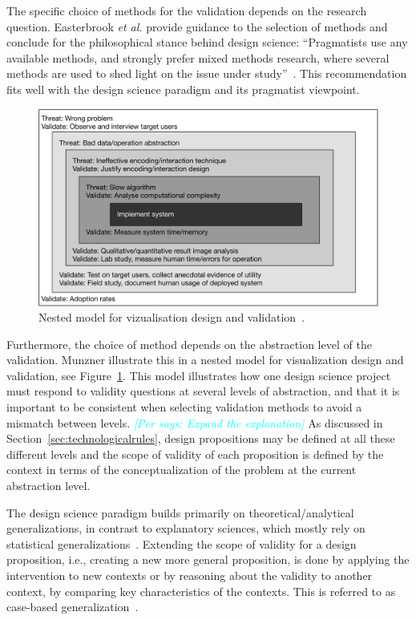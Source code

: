 \documentclass[graybox]{svmult}
\newcommand{\per}[1]{\textcolor{cyan}{{\it [Per says: #1]}}}
\newcommand{\per}[1]{}
\begin{document}
The specific choice of methods for the validation depends on the research question. Easterbrook \emph{et al.} provide guidance to the selection of methods and conclude for the philosophical stance behind design science: ``Pragmatists use any available methods, and strongly prefer mixed methods research, where several methods are used to shed light on the issue under study''~\cite{easterbrook_selecting_2008}. 
This recommendation fits well with the design science paradigm and its pragmatist viewpoint.

\begin{figure}[t]
  \includegraphics[width=\textwidth]{Figures/nested_model.pdf}
\caption{Nested model for vizualisation design and validation~\cite{munzner2009}.}
\label{fig:nested_model}       %
\end{figure} 

Furthermore, the choice of method depends on the abstraction level of the validation. Munzner illustrate this in a nested model for visualization design and validation, see Figure~\ref{fig:nested_model}. This model illustrates how one design science project must respond to validity questions at several levels of abstraction, and that it is important to be consistent when selecting validation methods to avoid a mismatch between levels. \per{Expand the explanation} As discussed in Section~\ref{sec:technologicalrules}, design propositions may be defined at all these different levels and the scope of validity of each proposition is defined by the context in terms of the conceptualization of the problem at the current abstraction level.

The design science paradigm builds primarily on theoretical/analytical generalizations, in contrast to explanatory sciences, which mostly rely on statistical generalizations~\cite[p. 30]{Runeson12Case}. Extending the scope of validity for a design proposition, i.e., creating a new more general proposition, is done by applying the intervention to new contexts or by reasoning about the validity to another context, by comparing key characteristics of the contexts. This is referred to as case-based generalization~\cite{wieringa_six_2015}.  
\end{document}
